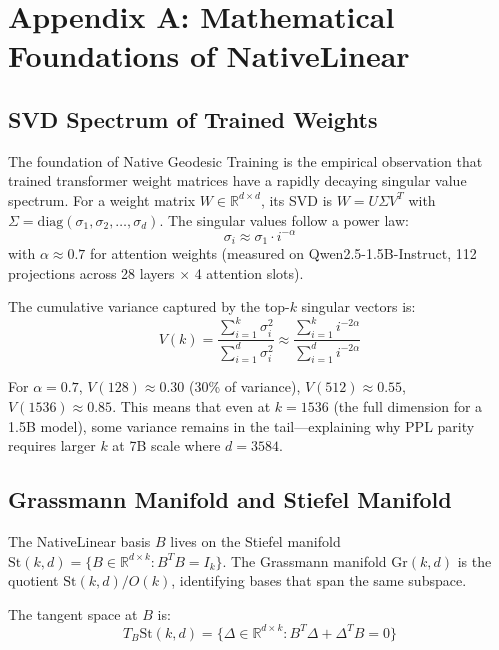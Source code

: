 \documentclass[11pt,a4paper]{article}
\begin{document}
\newpage
\newpage

\section{Appendix A: Mathematical Foundations of NativeLinear}

\subsection{SVD Spectrum of Trained Weights}

The foundation of Native Geodesic Training is the empirical observation that trained transformer weight matrices have a rapidly decaying singular value spectrum. For a weight matrix $W \in \mathbb{R}^{d \times d}$, its SVD is $W = U \Sigma V^T$ with $\Sigma = \mathrm{diag}(\sigma_1, \sigma_2, \ldots, \sigma_d)$. The singular values follow a power law:
\begin{equation}
\sigma_i \approx \sigma_1 \cdot i^{-\alpha}
\end{equation}
with $\alpha \approx 0.7$ for attention weights (measured on Qwen2.5-1.5B-Instruct, 112 projections across 28 layers $\times$ 4 attention slots).

The cumulative variance captured by the top-$k$ singular vectors is:
\begin{equation}
V(k) = \frac{\sum_{i=1}^k \sigma_i^2}{\sum_{i=1}^d \sigma_i^2} \approx \frac{\sum_{i=1}^k i^{-2\alpha}}{\sum_{i=1}^d i^{-2\alpha}}
\end{equation}

For $\alpha = 0.7$, $V(128) \approx 0.30$ (30\% of variance), $V(512) \approx 0.55$, $V(1536) \approx 0.85$. This means that even at $k=1536$ (the full dimension for a 1.5B model), some variance remains in the tail---explaining why PPL parity requires larger $k$ at 7B scale where $d=3584$.

\subsection{Grassmann Manifold and Stiefel Manifold}

The NativeLinear basis $B$ lives on the Stiefel manifold $\mathrm{St}(k,d) = \{B \in \mathbb{R}^{d \times k} : B^T B = I_k\}$. The Grassmann manifold $\mathrm{Gr}(k,d)$ is the quotient $\mathrm{St}(k,d) / O(k)$, identifying bases that span the same subspace.

The tangent space at $B$ is:
\begin{equation}
T_B \mathrm{St}(k,d) = \{\Delta \in \mathbb{R}^{d \times k} : B^T \Delta + \Delta^T B = 0\}
\end{equation}
\end{document}
